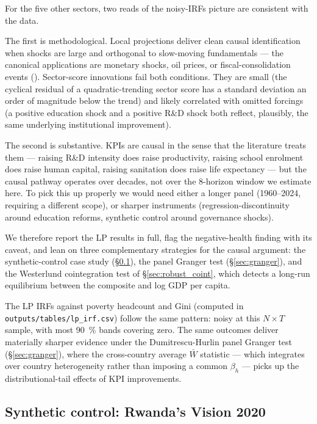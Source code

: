 For the five other sectors, two reads of the noisy-IRFs picture are consistent with the data.

The first is methodological. Local projections deliver clean causal identification when shocks are large and orthogonal to slow-moving fundamentals --- the canonical applications are monetary shocks, oil prices, or fiscal-consolidation events (\cite{jordataylor2016}). Sector-score innovations fail both conditions. They are small (the cyclical residual of a quadratic-trending sector score has a standard deviation an order of magnitude below the trend) and likely correlated with omitted forcings (a positive education shock and a positive R\&D shock both reflect, plausibly, the same underlying institutional improvement).

The second is substantive. KPIs are causal in the sense that the literature treats them --- raising R\&D intensity does raise productivity, raising school enrolment does raise human capital, raising sanitation does raise life expectancy --- but the causal pathway operates over decades, not over the 8-horizon window we estimate here. To pick this up properly we would need either a longer panel (1960--2024, requiring a different scope), or sharper instruments (regression-discontinuity around education reforms, synthetic control around governance shocks).

We therefore report the LP results in full, flag the negative-health finding with its caveat, and lean on three complementary strategies for the causal argument: the synthetic-control case study (\S\ref{sec:synthrwanda}), the panel Granger test (\S\ref{sec:granger}), and the Westerlund cointegration test of \S\ref{sec:robust_coint}, which detects a long-run equilibrium between the composite and log GDP per capita.

The LP IRFs against poverty headcount and Gini (computed in \texttt{outputs/tables/lp\_irf.csv}) follow the same pattern: noisy at this $N \times T$ sample, with most 90~\% bands covering zero. The same outcomes deliver materially sharper evidence under the Dumitrescu-Hurlin panel Granger test (\S\ref{sec:granger}), where the cross-country average $\bar W$ statistic --- which integrates over country heterogeneity rather than imposing a common $\beta_h$ --- picks up the distributional-tail effects of KPI improvements.

\subsection{Synthetic control: Rwanda's Vision 2020}\label{sec:synthrwanda}

